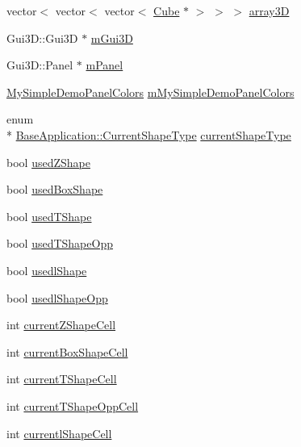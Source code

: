 \begin{DoxyCompactItemize}
\item 
vector$<$ vector$<$ vector$<$ \hyperlink{class_cube}{Cube} $\ast$ $>$ $>$ $>$ \hyperlink{class_base_application_a1d4876d5a2f4d69a9a0fae61ee8f5127}{array3\-D}
\item 
Gui3\-D\-::\-Gui3\-D $\ast$ \hyperlink{class_base_application_aaa51f685a5ab1f23b6152f12dbdd86a5}{m\-Gui3\-D}
\item 
Gui3\-D\-::\-Panel $\ast$ \hyperlink{class_base_application_ad367e0814cd650819f0a6b8460488f2f}{m\-Panel}
\item 
\hyperlink{struct_my_simple_demo_panel_colors}{My\-Simple\-Demo\-Panel\-Colors} \hyperlink{class_base_application_ae282cc9731cc19ae3f7c1889091c6480}{m\-My\-Simple\-Demo\-Panel\-Colors}
\item 
enum \\*
\hyperlink{class_base_application_abc714ee35568ef8090a07419fd391ba7}{Base\-Application\-::\-Current\-Shape\-Type} \hyperlink{class_base_application_ae6b860cfe7188f6c1dd32bd6fecfd2a9}{current\-Shape\-Type}
\item 
bool \hyperlink{class_base_application_abde703d00837e1f9c80698e820529a95}{used\-Z\-Shape}
\item 
bool \hyperlink{class_base_application_a97e267ce8eda15e4bec536817d9546ee}{used\-Box\-Shape}
\item 
bool \hyperlink{class_base_application_a77fa12fbd79ae12dc609b29859452e51}{used\-T\-Shape}
\item 
bool \hyperlink{class_base_application_a0997587550f66c6425a2fae78f64e2b1}{used\-T\-Shape\-Opp}
\item 
bool \hyperlink{class_base_application_a1192e80769f65e87c5cc6d7aa37d3040}{usedl\-Shape}
\item 
bool \hyperlink{class_base_application_a1617c0606b49229803b7a3ecb2d6f936}{usedl\-Shape\-Opp}
\item 
int \hyperlink{class_base_application_a9bff1519bcaf61fc3cbcc3c66ec273a3}{current\-Z\-Shape\-Cell}
\item 
int \hyperlink{class_base_application_a6cc81cb0cda55bee078cd0fe4a053a55}{current\-Box\-Shape\-Cell}
\item 
int \hyperlink{class_base_application_ae43613d0e1142a6e9b12723d5b49da1b}{current\-T\-Shape\-Cell}
\item 
int \hyperlink{class_base_application_a46497f2f8c6f6b9e34bcb7986882715f}{current\-T\-Shape\-Opp\-Cell}
\item 
int \hyperlink{class_base_application_a53b5c467e53fde6b453021bff907b26d}{currentl\-Shape\-Cell}

\end{DoxyCompactItemize}
